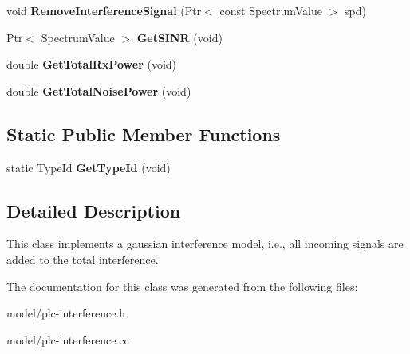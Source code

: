 \begin{DoxyCompactItemize}
\item 
\hypertarget{classns3_1_1PLC__Interference_ae89a2841054afd0218648e992563de33}{void {\bfseries \-Remove\-Interference\-Signal} (\-Ptr$<$ const \-Spectrum\-Value $>$ spd)}\label{classns3_1_1PLC__Interference_ae89a2841054afd0218648e992563de33}

\item 
\hypertarget{classns3_1_1PLC__Interference_afd18cbd04f5e5b43d3227f9366484cd6}{\-Ptr$<$ \-Spectrum\-Value $>$ {\bfseries \-Get\-S\-I\-N\-R} (void)}\label{classns3_1_1PLC__Interference_afd18cbd04f5e5b43d3227f9366484cd6}

\item 
\hypertarget{classns3_1_1PLC__Interference_a627b2aceb9946da400a23adc5b0d57c6}{double {\bfseries \-Get\-Total\-Rx\-Power} (void)}\label{classns3_1_1PLC__Interference_a627b2aceb9946da400a23adc5b0d57c6}

\item 
\hypertarget{classns3_1_1PLC__Interference_a5788ba21418643ec78b782f28748a0d9}{double {\bfseries \-Get\-Total\-Noise\-Power} (void)}\label{classns3_1_1PLC__Interference_a5788ba21418643ec78b782f28748a0d9}

\end{DoxyCompactItemize}
\subsection*{\-Static \-Public \-Member \-Functions}
\begin{DoxyCompactItemize}
\item 
\hypertarget{classns3_1_1PLC__Interference_ad0047c99648c847679d9a583979ddc10}{static \-Type\-Id {\bfseries \-Get\-Type\-Id} (void)}\label{classns3_1_1PLC__Interference_ad0047c99648c847679d9a583979ddc10}

\end{DoxyCompactItemize}


\subsection{\-Detailed \-Description}
\-This class implements a gaussian interference model, i.\-e., all incoming signals are added to the total interference. 

\-The documentation for this class was generated from the following files\-:\begin{DoxyCompactItemize}
\item 
model/plc-\/interference.\-h\item 
model/plc-\/interference.\-cc\end{DoxyCompactItemize}
